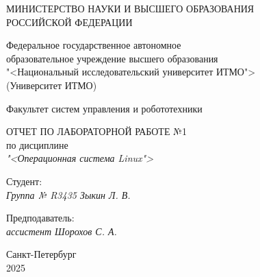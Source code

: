 \thispagestyle{empty}

\begin{center}
    МИНИСТЕРСТВО НАУКИ И ВЫСШЕГО ОБРАЗОВАНИЯ \\ РОССИЙСКОЙ ФЕДЕРАЦИИ

    \vspace{20pt}

    Федеральное государственное автономное \\ образовательное учреждение высшего образования \\
    "<Национальный исследовательский университет ИТМО"> \\
    (Университет ИТМО)

    \vspace{20pt}

    Факультет систем управления и робототехники
\end{center}

\vfill

\begin{center}
    ОТЧЕТ ПО ЛАБОРАТОРНОЙ РАБОТЕ №1\\  
    по дисциплине \\
    \textit{"<Операционная система Linux">}

    \vspace{20pt}

    
\end{center}

\vfill

    \noindent Студент: \\
    \textit{Группа № R3435 \hfill Зыкин Л. В.}

    \vspace{20pt}

    \noindent Предподаватель: \\
    \textit{ассистент \hfill Шорохов С. А.}

\vfill

\begin{center}
    Санкт-Петербург \\ 2025
\end{center}